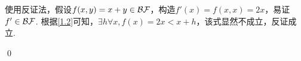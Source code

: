 \begin{pf} \rm 
    使用反证法，假设$f(x, y)=x+y\in\mathcal{BF}$，构造$f'(x) = f(x, x) = 2x$，易证$f'\in\mathcal{BF}$. 根据\ref{1.2}可知，$\exists h\forall x, f(x)=2x<x+h$，该式显然不成立，反证成立.

    \qed
\end{pf}
